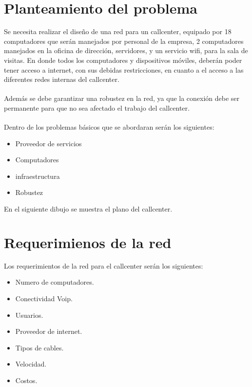 \documentclass[12pt]{article}
\begin{document}
\section{\textbf{Planteamiento del problema}}
Se necesita realizar el diseño de una red para un callcenter, equipado por 18 computadores que serán manejados por personal de la empresa, 2 computadores manejados en la oficina de dirección, servidores, y un servicio wifi, para la sala de visitas. En donde todos los computadores y dispositivos móviles, deberán poder tener acceso a internet, con sus debidas restricciones, en cuanto a el acceso a las diferentes redes internas del callcenter.\\\\
Además se debe garantizar una robustez en la red, ya que la conexión debe ser permanente para que no sea afectado el trabajo del callcenter.\\\\
Dentro de los problemas básicos que se abordaran serán los siguientes:
\begin{itemize}
\item
Proveedor de servicios
\item
Computadores
\item
infraestructura
\item
Robustez
\end{itemize}
\pagebreak
En el siguiente dibujo se muestra el plano del callcenter.
\begin{center}
\end{center}
\pagebreak
\section{\textbf{Requerimienos de la red}}
Los requerimientos de la red para el callcenter serán los siguientes:
\begin{itemize}
\item
Numero de computadores.
\item
Conectividad Voip.
\item
Usuarios.
\item
Proveedor de internet.
\item
Tipos de cables.
\item
Velocidad.
\item
Costos.
\end{itemize}
\end{document}
